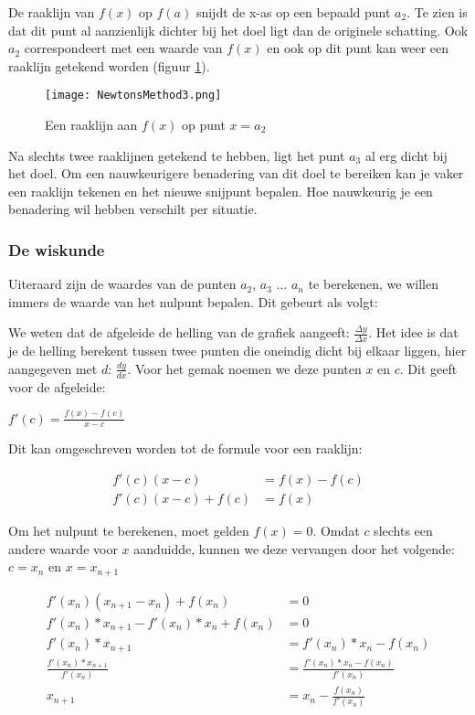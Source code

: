 De raaklijn van $ f(x) $ op $ f(a) $ snijdt de x-as op een bepaald punt $ a_2 $. Te zien is dat dit punt al aanzienlijk dichter bij het doel ligt dan de originele schatting. Ook $ a_2 $ correspondeert met een waarde van $ f(x) $ en ook op dit punt kan weer een raaklijn getekend worden (figuur \ref{fig:NM3}).

\begin{figure}[H]
  \centering
    \texttt{[image: NewtonsMethod3.png]}
  \caption{Een raaklijn aan $ f(x) $ op punt $ x = a_2 $}
  \label{fig:NM3}
\end{figure}

Na slechts twee raaklijnen getekend te hebben, ligt het punt $ a_3 $ al erg dicht bij het doel. Om een nauwkeurigere benadering van dit doel te bereiken kan je vaker een raaklijn tekenen en het nieuwe snijpunt bepalen. Hoe nauwkeurig je een benadering wil hebben verschilt per situatie.

\subsubsection{De wiskunde}
Uiteraard zijn de waardes van de punten $ a_2 $, $ a_3 $ ... $ a_n $ te berekenen, we willen immers de waarde van het nulpunt bepalen. Dit gebeurt als volgt:

We weten dat de afgeleide de helling van de grafiek aangeeft: $ \frac{\Delta y}{\Delta x} $. Het idee is dat je de helling berekent tussen twee punten die oneindig dicht bij elkaar liggen, hier aangegeven met $d$: $ \frac{dy}{dx} $. Voor het gemak noemen we deze punten $x$ en $c$. Dit geeft voor de afgeleide:

\begin{center}
$ f'(c) = \frac{f(x) - f(c)}{x - c}$
\end{center}

Dit kan omgeschreven worden tot de formule voor een raaklijn:

\begin{align*}
	   f'(c)(x - c) &= f(x) - f(c) \\
f'(c)(x - c) + f(c) &= f(x)
\end{align*}

Om het nulpunt te berekenen, moet gelden $ f(x) = 0 $. Omdat $c$ slechts een andere waarde voor $x$ aanduidde, kunnen we deze vervangen door het volgende: $ c = x_n $ en $ x = x_{n+1} $

\begin{align*}
			 f'(x_n)(x_{n+1} - x_n) + f(x_n) &= 0 \\
	f'(x_n)* x_{n+1} - f'(x_n) * x_n + f(x_n)&= 0 \\
							f'(x_n)* x_{n+1} &= f'(x_n) * x_n - f(x_n) \\
		   \frac{f'(x_n) * x_{n+1}}{f'(x_n)} &= \frac{f'(x_n) * x _n - f(x_n)}{f'(x_n)} \\
									  x_{n+1}&= x_n - \frac{f(x_n)}{f'(x_n)}
\end{align*}

